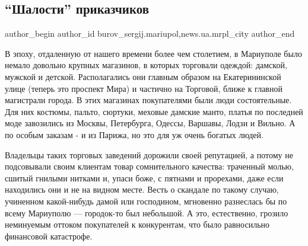  
 
 
 
 
 
\subsection{\enquote{Шалости} приказчиков}
\label{sec:22_07_2017.stz.news.ua.mrpl_city.1.shalosti_prikazchikov}
 
\ifcmt
 author_begin
   author_id burov_sergij.mariupol,news.ua.mrpl_city
 author_end
\fi

В эпоху, отдаленную от  нашего времени более чем столетием, в Мариуполе было
немало довольно крупных магазинов, в которых торговали одеждой: дамской,
мужской и детской. Располагались они главным образом на Екатерининской улице
(теперь это проспект Мира) и частично на Торговой, ближе к главной  магистрали
города. В этих магазинах покупателями были люди состоятельные. Для них костюмы,
пальто, сюртуки, меховые дамские манто, платья по последней моде завозились из
Москвы, Петербурга, Одессы, Варшавы, Лодзи и Вильно. А по особым заказам -  и
из Парижа, но это для уж очень богатых людей.


Владельцы таких торговых заведений дорожили своей репутацией, а потому не
подсовывали своим клиентам товар сомнительного качества: траченный молью,
сшитый гнилыми нитками и, упаси боже, с пятнами и прорехами, даже если
находились они и не на видном месте. Весть о скандале по такому случаю,
учиненном какой-нибудь дамой или господином, мгновенно разнеслась бы по всему
Мариуполю — городок-то был небольшой. А это, естественно, грозило неминуемым
оттоком покупателей к конкурентам, что было равносильно финансовой катастрофе.


